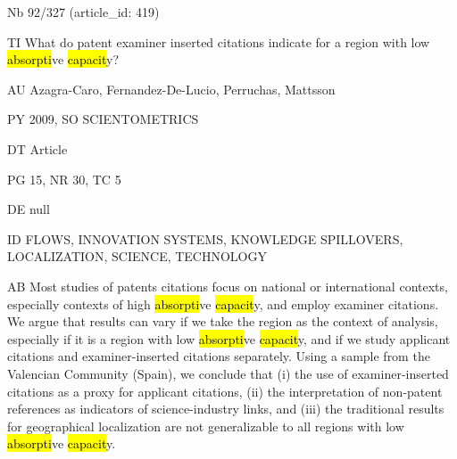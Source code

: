 \documentclass[a4paper]{article}
\begin{document}
\vspace*{-2cm}
Nb \tabto{0cm}92/327 (article\_id: 419)\par
TI \tabto{0cm}What do patent examiner inserted citations indicate for a region with low \hl{absorpti}ve \hl{capacit}y?\par
AU \tabto{0cm}Azagra-Caro, Fernandez-De-Lucio, Perruchas, Mattsson\par
PY \tabto{0cm}2009, SO SCIENTOMETRICS\par
DT \tabto{0cm}Article\par
PG \tabto{0cm}15, NR 30, TC 5\par
DE \tabto{0cm}null\par
ID \tabto{0cm}FLOWS, INNOVATION SYSTEMS, KNOWLEDGE SPILLOVERS, LOCALIZATION, SCIENCE, TECHNOLOGY\par
AB \tabto{0cm}Most studies of patents citations focus on national or international contexts, especially contexts of high \hl{absorpti}ve \hl{capacit}y, and employ examiner citations. We argue that results can vary if we take the region as the context of analysis, especially if it is a region with low \hl{absorpti}ve \hl{capacit}y, and if we study applicant citations and examiner-inserted citations separately. Using a sample from the Valencian Community (Spain), we conclude that (i) the use of examiner-inserted citations as a proxy for applicant citations, (ii) the interpretation of non-patent references as indicators of science-industry links, and (iii) the traditional results for geographical localization are not generalizable to all regions with low \hl{absorpti}ve \hl{capacit}y.\par
\clearpage
\end{document}
